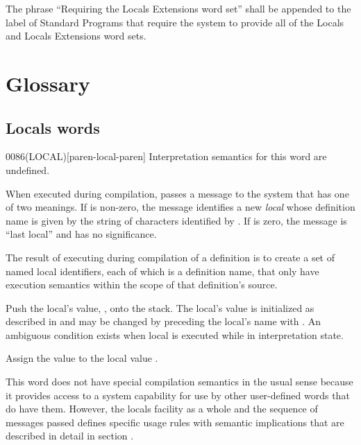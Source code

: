 The phrase ``Requiring the Locals Extensions word set'' shall be
appended to the label of Standard Programs that require the system
to provide all of the Locals and Locals Extensions word sets.


\section{Glossary} %

\subsection{Locals words} %

\enlargethispage{4ex}
\begin{worddef}[LOCAL]{0086}{(LOCAL)}[paren-local-paren]
\interpret
	Interpretation semantics for this word are undefined.

\execute

	When executed during compilation,  passes a
	message to the system that has one of two meanings. If 
	is non-zero, the message identifies a new \emph{local} whose
	definition name is given by the string of characters identified
	by . If  is zero, the message is ``last
	local'' and  has no significance.

	The result of executing  during compilation of a
	definition is to create a set of named local identifiers, each
	of which is a definition name, that only have execution
	semantics within the scope of that definition's source.

\execute[local]

	Push the local's value, , onto the stack. The local's
	value is initialized as described in  and may be changed by preceding the local's
	name with . An ambiguous condition exists when local is
	executed while in interpretation state.

 

	Assign the value  to the local value .

\note
	This word does not have special compilation semantics in the
	usual sense because it provides access to a system capability
	for use by other user-defined words that do have them. However,
	the locals facility as a whole and the sequence of messages
	passed defines specific usage rules with semantic implications
	that are described in detail in section
	.


\end{worddef}
